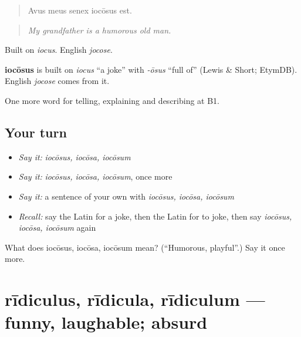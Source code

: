 \begin{quote}
Avus meus senex iocōsus est.
\end{quote}

\begin{quote}
\emph{My grandfather is a humorous old man.}
\end{quote}

Built on \emph{iocus}. English \emph{jocose}.

\begin{cousinweb}
\textbf{iocōsus} is built on \emph{iocus} \textquotedblleft{}a joke\textquotedblright{} with \emph{-ōsus} \textquotedblleft{}full of\textquotedblright{} (Lewis \& Short; EtymDB). English \emph{jocose} comes from it.
\end{cousinweb}

\begin{grammarlens}[title={What you've built}]
One more word for telling, explaining and describing at B1.
\end{grammarlens}

\subsection*{Your turn}
\begin{itemize}
\raggedright
  \item \emph{Say it:} \emph{iocōsus, iocōsa, iocōsum}
  \item \emph{Say it:} \emph{iocōsus, iocōsa, iocōsum}, once more
  \item \emph{Say it:} a sentence of your own with \emph{iocōsus, iocōsa, iocōsum}
  \item \emph{Recall:} say the Latin for a joke, then the Latin for to joke, then say \emph{iocōsus, iocōsa, iocōsum} again
\end{itemize}

\begin{tcolorbox}[breakable,colback=teal!4,colframe=teal!35!black,title={Before you move on}]
What does iocōsus, iocōsa, iocōsum mean? (\textquotedblleft{}Humorous, playful\textquotedblright{}.) Say it once more.
\end{tcolorbox}
\section[rīdiculus, rīdicula, rīdiculum]{rīdiculus, rīdicula, rīdiculum — funny, laughable; absurd}

\label{lesson:LA-C502-ridiculus}




